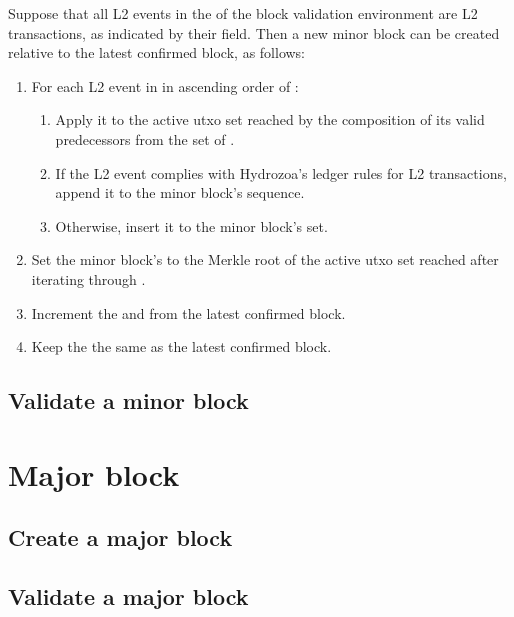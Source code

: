 \documentclass[../hydrozoa.tex]{subfiles}
\begin{document}
Suppose that all L2 events in the  of the block validation environment are L2 transactions, as indicated by their  field.
Then a new minor block can be created relative to the latest confirmed block, as follows:
\begin{enumerate}
  \item For each L2 event in  in ascending order of :
      \begin{enumerate}
        \item Apply it to the active utxo set reached by the composition of its valid predecessors from the  set of .
        \item If the L2 event complies with Hydrozoa's ledger rules for L2 transactions, append it to the minor block's  sequence.
        \item Otherwise, insert it to the minor block's  set.
      \end{enumerate}
  \item Set the minor block's  to the Merkle root of the active utxo set reached after iterating through .
  \item Increment the  and  from the latest confirmed block.
  \item Keep the  the same as the latest confirmed block.
\end{enumerate}

\subsection{Validate a minor block}%
\label{h:l2-minor-block-validate}%


\section{Major block}%
\label{h:l2-major-block}%


\subsection{Create a major block}%
\label{h:l2-major-block-create}%


\subsection{Validate a major block}%
\label{h:l2-major-block-validate}%
\end{document}
